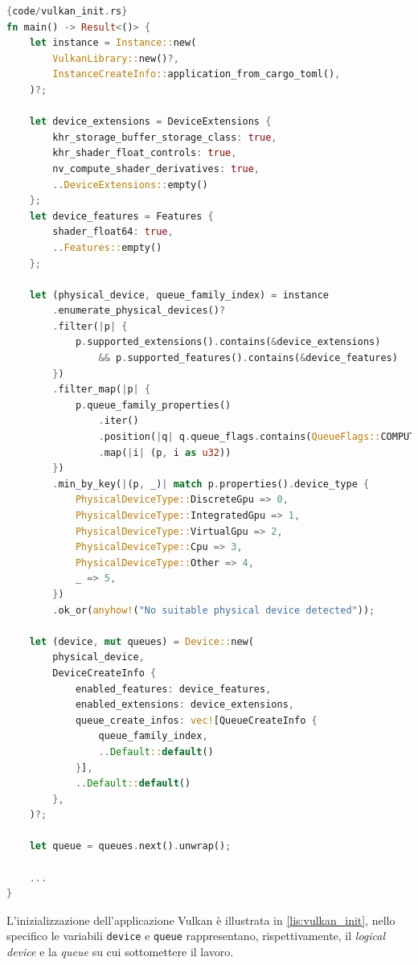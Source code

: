 \vspace{5mm}
\begin{lstlisting}[language=Rust, caption=Inizializzazione di Vulkan in Rust, label=lis:vulkan_init]{code/vulkan_init.rs} 
fn main() -> Result<()> {
    let instance = Instance::new(
        VulkanLibrary::new()?,
        InstanceCreateInfo::application_from_cargo_toml(),
    )?;

    let device_extensions = DeviceExtensions {
        khr_storage_buffer_storage_class: true,
        khr_shader_float_controls: true,
        nv_compute_shader_derivatives: true,
        ..DeviceExtensions::empty()
    };
    let device_features = Features {
        shader_float64: true,
        ..Features::empty()
    };

    let (physical_device, queue_family_index) = instance
        .enumerate_physical_devices()?
        .filter(|p| {
            p.supported_extensions().contains(&device_extensions)
                && p.supported_features().contains(&device_features)
        })
        .filter_map(|p| {
            p.queue_family_properties()
                .iter()
                .position(|q| q.queue_flags.contains(QueueFlags::COMPUTE))
                .map(|i| (p, i as u32))
        })
        .min_by_key(|(p, _)| match p.properties().device_type {
            PhysicalDeviceType::DiscreteGpu => 0,
            PhysicalDeviceType::IntegratedGpu => 1,
            PhysicalDeviceType::VirtualGpu => 2,
            PhysicalDeviceType::Cpu => 3,
            PhysicalDeviceType::Other => 4,
            _ => 5,
        })
        .ok_or(anyhow!("No suitable physical device detected"));

    let (device, mut queues) = Device::new(
        physical_device,
        DeviceCreateInfo {
            enabled_features: device_features,
            enabled_extensions: device_extensions,
            queue_create_infos: vec![QueueCreateInfo {
                queue_family_index,
                ..Default::default()
            }],
            ..Default::default()
        },
    )?;

    let queue = queues.next().unwrap();

    ...
}
\end{lstlisting}
\vspace{5mm}

L'inizializzazione dell'applicazione Vulkan è illustrata in \ref{lis:vulkan_init}, nello specifico le variabili \verb|device| e \verb|queue| rappresentano, rispettivamente, il \textit{logical device} e la \textit{queue} su cui sottomettere il lavoro. 


